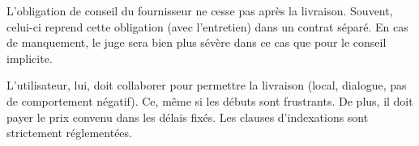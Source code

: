 \documentclass[fleqn,letterpaper, 12pt]{article}
\begin{document}
	L'obligation de conseil du fournisseur ne cesse pas après la livraison. Souvent, celui-ci reprend cette obligation (avec l'entretien) dans un contrat séparé. En cas de manquement, le juge sera bien plus sévère dans ce cas que pour le conseil implicite.
	
	L'utilisateur, lui, doit collaborer pour permettre la livraison (local, dialogue, pas de comportement négatif). Ce, même si les débuts sont frustrants. De plus, il doit payer le prix convenu dans les délais fixés. Les clauses d'indexations sont strictement réglementées.
	
	
	
	
	


	
	
	
	
\end{document}

